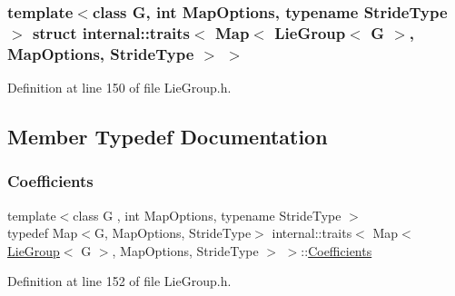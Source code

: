 \subsubsection*{template$<$class G, int Map\+Options, typename Stride\+Type$>$\newline
struct internal\+::traits$<$ Map$<$ Lie\+Group$<$ G $>$, Map\+Options, Stride\+Type $>$ $>$}



Definition at line 150 of file Lie\+Group.\+h.



\subsection{Member Typedef Documentation}
\hypertarget{structinternal_1_1traits_3_01_map_3_01_lie_group_3_01_g_01_4_00_01_map_options_00_01_stride_type_01_4_01_4_ae1223cb79de3b5f754afbacf6b0b956f}{}\label{structinternal_1_1traits_3_01_map_3_01_lie_group_3_01_g_01_4_00_01_map_options_00_01_stride_type_01_4_01_4_ae1223cb79de3b5f754afbacf6b0b956f} 
\subsubsection{\texorpdfstring{Coefficients}{Coefficients}}
{\footnotesize\ttfamily template$<$class G , int Map\+Options, typename Stride\+Type $>$ \\
typedef Map$<$G, Map\+Options, Stride\+Type$>$ internal\+::traits$<$ Map$<$ \hyperlink{class_lie_group}{Lie\+Group}$<$ G $>$, Map\+Options, Stride\+Type $>$ $>$\+::\hyperlink{structinternal_1_1traits_3_01_map_3_01_lie_group_3_01_g_01_4_00_01_map_options_00_01_stride_type_01_4_01_4_ae1223cb79de3b5f754afbacf6b0b956f}{Coefficients}}



Definition at line 152 of file Lie\+Group.\+h.

\hypertarget{structinternal_1_1traits_3_01_map_3_01_lie_group_3_01_g_01_4_00_01_map_options_00_01_stride_type_01_4_01_4_ac813c011f308189694ce54531fa28da5}{}\label{structinternal_1_1traits_3_01_map_3_01_lie_group_3_01_g_01_4_00_01_map_options_00_01_stride_type_01_4_01_4_ac813c011f308189694ce54531fa28da5} 

